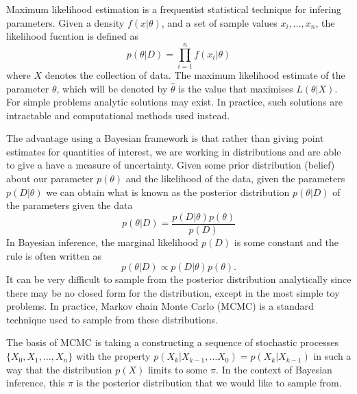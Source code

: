 Maximum likelihood estimation is a frequentist statistical technique for infering parameters. Given a density $f(x|\theta)$, and a set of sample values $x_i,\ldots,x_n$, the likelihood fucntion is defined as  
	\begin{equation}
		p(\theta|D) = \prod_{i=1}^{n}f(x_i|\theta)
	\end{equation}
where $X$ denotes the collection of data. The maximum likelihood estimate of the parameter $\theta$, which will be denoted by $\hat{\theta}$ is the value that maximises $L(\theta|X)$. For simple problems analytic solutions may exist. In practice, such solutions are intractable and computational methods used instead.

The advantage using a Bayesian framework is that rather than giving point estimates for quantities of interest, we are working in distributions and are able to give a have a measure of uncertainty. Given some prior distribution (belief) about our parameter $p(\theta)$ and the likelihood of the data, given the parameters $p(D|\theta)$ we can obtain what is known as the posterior distribution $ p(\theta|D)$ of the parameters given the data 
    \begin{equation}
        p(\theta|D) = \frac{p(D|\theta)p(\theta)}{p(D)}
    \end{equation}
In Bayesian inference, the marginal likelihood $p(D)$ is some constant and the rule is often written as 
    \begin{equation}
        p(\theta|D) \propto p(D|\theta)p(\theta).
    \end{equation}
It can be very difficult to sample from the posterior distribution analytically since there may be no closed form for the distribution, except in the most simple toy problems. In practice, Markov chain Monte Carlo (MCMC) is a standard technique used to sample from these distributions. 

The basis of MCMC is taking a constructing a sequence of stochastic processes $\{X_0,X_1,\ldots,X_n\}$ with the property $p(X_k|X_{k-1},\ldots X_0) = p(X_k|X_{k-1})$ in such a way that the distribution $p(X)$ limits to some $\pi$. In the context of Bayesian inference, this $\pi$ is the posterior distribution that we would like to sample from.